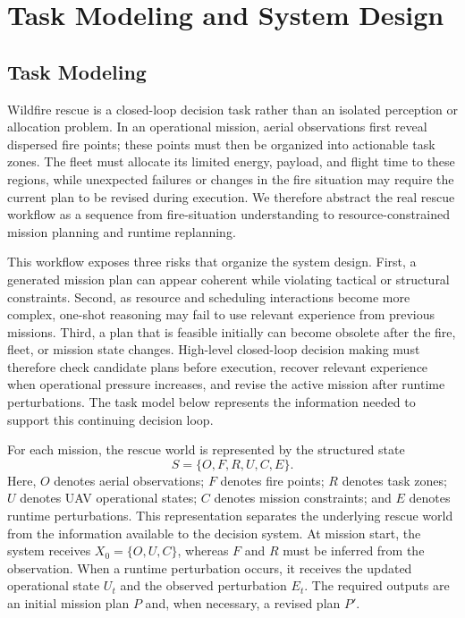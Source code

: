 \section{Task Modeling and System Design}

\subsection{Task Modeling}

Wildfire rescue is a closed-loop decision task rather than an isolated
perception or allocation problem. In an operational mission, aerial observations
first reveal dispersed fire points; these points must then be organized into
actionable task zones. The fleet must allocate its limited energy,
payload, and flight time to these regions, while unexpected failures or changes
in the fire situation may require the current plan to be revised during
execution. We therefore abstract the real rescue workflow as a sequence from
fire-situation understanding to resource-constrained mission planning and
runtime replanning.

This workflow exposes three risks that organize the system design. First, a
generated mission plan can appear coherent while violating tactical or
structural constraints. Second, as resource and scheduling interactions become
more complex, one-shot reasoning may fail to use relevant experience from
previous missions. Third, a plan that is feasible initially can become obsolete
after the fire, fleet, or mission state changes. High-level closed-loop decision
making must therefore check candidate plans before execution, recover relevant
experience when operational pressure increases, and revise the active mission
after runtime perturbations. The task model below represents the information
needed to support this continuing decision loop.

For each mission, the rescue world is represented by the structured state
\[
S=\{O,F,R,U,C,E\}.
\]
Here, $O$ denotes aerial observations; $F$ denotes fire points; $R$ denotes
task zones; $U$ denotes UAV operational states; $C$ denotes mission constraints;
and $E$ denotes runtime perturbations. This representation
separates the underlying rescue world from the information available to the
decision system. At mission start, the system receives $X_0=\{O,U,C\}$,
whereas $F$ and $R$ must be inferred from the observation. When a runtime
perturbation occurs, it receives the updated operational state $U_t$ and the
observed perturbation $E_t$. The required outputs are an initial mission plan
$P$ and, when necessary, a revised plan $P'$.

